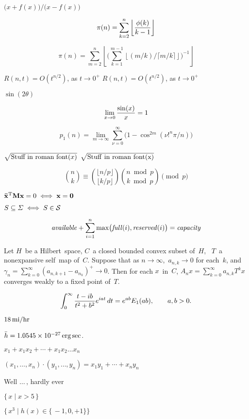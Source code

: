 $\bigl( x + f(x)\bigr) \big/ \bigl( x - f(x) \bigr)$
%

$$\pi(n) = 
    {\sum^n_{k=2}
    {\left\lfloor{{\phi(k)}\over{k-1}}\right\rfloor}}
$$


$$
\pi(n) =
{\sum^n_{m=2}{
    \left\lfloor
    \bigg(
    \sum^{m-1}_{k=1}
	\left\lfloor
	(m/k) \big/ \lceil m/k \rceil
	\right\rfloor
    \bigg)
    ^{-1}
    \right\rfloor}
}
$$

$R(n,t) = O(t^{n/2})$, as $t \rightarrow 0^+$
$R(n,t) = O(t^{n/2})$, as $t \to 0^+$

$\sin(2\theta)$

$$\lim_{x \to 0}{\sin(x)\over{x}} = 1$$

$$p_1(n) = 
    \lim_{m \to \infty} 
	\sum^\infty_{\nu=0}
	{
	    \bigl( 1-\cos^{2m} 
		(\nu!^n\pi\big/n)
	    \bigr)
	}
$$

$\sqrt{\hbox{Stuff in roman font}(x)}$
$\sqrt{\rm{Stuff\ in\ roman\ font}(x)}$

$${n\choose k} \equiv 
    {{\lfloor n/p \rfloor} \choose{\lfloor k/p \rfloor}}
    {{n \bmod p} \choose {k \bmod p}}
    \pmod p
$$


$\bf\bar x^{\rm T}Mx={\rm 0}\iff x=0$

$S \subseteq{\mit\Sigma} \iff S \in{\cal S}$

$${\it available} + \sum^n_{i=1} \max
    \bigl( {\it full}(i), {\it reserved}(i) \bigr)
= {\it capacity}$$

Let $H$~be a Hilbert~space, $C$~a closed bounded convex subset of~$H$, \ 
$T$~a nonexpansive self~map of~$C$. Suppose that as $n \to \infty$,\ $a_{n,k} \to 0$
for each~$k$, and 
    $\gamma_n = \sum^\infty_{k=0} (a_{n,k+1} - a_{n_k} )^+ \to 0$.
Then for each $x$~in~$C$, 
    $A_nx=\sum^\infty_{k=0}a_{n,k}T^kx$
converges weakly to a fixed point of~$T$.



$$\int^\infty_0 {{t-ib}\over{t^2+b^2}} e^{iat} \, dt =
    e^{ab}E_1(ab),
    \qquad
    a,b>0.
$$


$18\, {\rm mi/hr}$

$\bar{h} = 1.0545 \times 10^{-27} \rm \, erg \, sec$.

$x_1 + x_1x_2 + \cdots + x_1x_2\ldots x_n$

$(x_1,\ldots, x_n) \cdot (y_1,\ldots, y_n) = x_1y_1 + \cdots + x_ny_n$

Well $\ldots\,$, hardly ever

$\{\, x \mid x > 5 \, \}$

$\bigl\{ \,x^3 \mid h(x) \in \{\, -1, 0, +1 \} \bigr\}$

